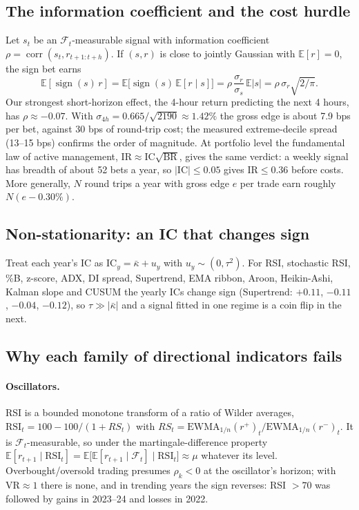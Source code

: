 \documentclass[11pt,a4paper]{article}
\theoremstyle{definition}
\begin{document}
\subsection{The information coefficient and the cost hurdle}
Let $s_t$ be an $\mathcal F_t$-measurable signal with information coefficient $\rho=\operatorname{corr}(s_t,r_{t+1:t+h})$. If $(s,r)$ is close to jointly Gaussian with $\mathbb E[r]=0$, the sign bet earns
\begin{equation}
\mathbb E[\operatorname{sign}(s)\,r]=\mathbb E\bigl[\operatorname{sign}(s)\,\mathbb E[r\mid s]\bigr]=\rho\,\frac{\sigma_r}{\sigma_s}\,\mathbb E|s|=\rho\,\sigma_r\sqrt{2/\pi}.
\end{equation}
Our strongest short-horizon effect, the 4-hour return predicting the next 4 hours, has $\rho\approx-0.07$. With $\sigma_{4h}=0.665/\sqrt{2190}\approx1.42\%$ the gross edge is about 7.9 bps per bet, against 30 bps of round-trip cost; the measured extreme-decile spread (13--15 bps) confirms the order of magnitude.
At portfolio level the fundamental law of active management, $\mathrm{IR}\approx\mathrm{IC}\sqrt{\mathrm{BR}}$, gives the same verdict: a weekly signal has breadth of about 52 bets a year, so $|\mathrm{IC}|\le0.05$ gives $\mathrm{IR}\le0.36$ before costs.
More generally, $N$ round trips a year with gross edge $e$ per trade earn roughly $N(e-0.30\%)$.

\subsection{Non-stationarity: an IC that changes sign}
Treat each year's IC as $\mathrm{IC}_y=\bar\kappa+u_y$ with $u_y\sim(0,\tau^2)$. For RSI, stochastic RSI, \%B, z-score, ADX, DI spread, Supertrend, EMA ribbon, Aroon, Heikin-Ashi, Kalman slope and CUSUM the yearly ICs change sign (Supertrend: $+0.11$, $-0.11$, $-0.04$, $-0.12$), so $\tau\gg|\bar\kappa|$ and a signal fitted in one regime is a coin flip in the next.

\subsection{Why each family of directional indicators fails}
\paragraph{Oscillators.} RSI is a bounded monotone transform of a ratio of Wilder averages, $\mathrm{RSI}_t=100-100/(1+RS_t)$ with $RS_t=\mathrm{EWMA}_{1/n}(r^+)_t/\mathrm{EWMA}_{1/n}(r^-)_t$. It is $\mathcal F_t$-measurable, so under the martingale-difference property $\mathbb E[r_{t+1}\mid\mathrm{RSI}_t]=\mathbb E\bigl[\mathbb E[r_{t+1}\mid\mathcal F_t]\mid\mathrm{RSI}_t\bigr]\approx\mu$ whatever its level. Overbought/oversold trading presumes $\rho_k<0$ at the oscillator's horizon; with $\mathrm{VR}\approx1$ there is none, and in trending years the sign reverses: RSI $>70$ was followed by gains in 2023--24 and losses in 2022.
\end{document}
